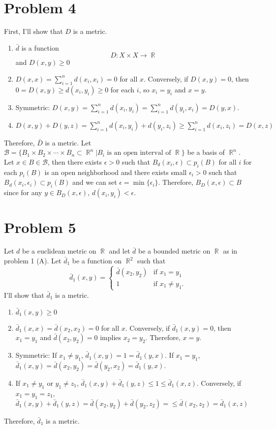 \documentclass{article}
\DeclareMathOperator{\rr}{\mathbb{R}}
\newcommand{\B}{\mathcal{B}}
\begin{document}
\section*{Problem 4}
First, I'll show that $D$ is a metric.
\begin{enumerate}
\item $\bar{d}$ is a function
\begin{equation*}
D:X\times X\longrightarrow \rr
\end{equation*}
and $D(x,y)\geq 0$
\item $D(x,x)=\sum\limits_{i=1}^n d(x_i, x_i)=0$ for all $x$. Conversely, if $D(x,y)=0$, then $ 0=D(x,y)\geq d(x_i, y_i)\geq 0$ for each $i$, so $x_i=y_i$ and $x=y$.
\item Symmetric: $D(x,y)=\sum\limits_{i=1}^n d(x_i, y_i)=\sum\limits_{i=1}^n d(y_i, x_i)=D(y,x)$.
\item $D(x,y)+D(y,z)=\sum\limits_{i=1}^n d(x_i, y_i)+ d(y_i, z_i)\geq \sum\limits_{i=1}^n d(x_i, z_i)=D(x,z)$
\end{enumerate}
Therefore, $\bar{D}$ is a metric.
Let $\B=\{B_1\times B_2\times\cdots\times B_n\subset \rr^n|B_i\text{ is an open interval of }\rr\}$ be a basis of $\rr^n$. Let $x\in B\in \B$, then there exists $\epsilon>0$ such that $B_d(x_i, \epsilon)\subset p_i(B)$ for all $i$ for each $p_i(B)$ is an open neighborhood and there exists small $\epsilon_i>0$ such that $B_d(x_i, \epsilon_i)\subset p_i(B)$ and we can set $\epsilon=\min\{\epsilon_i\}$. Therefore, $B_D(x, \epsilon)\subset B$ since for any $y\in B_D(x, \epsilon)$, $d(x_i, y_i)<\epsilon$.
\section*{Problem 5}
Let $d$ be a euclidean metric on $\rr$ and let $\bar{d}$ be a bounded metric on $\rr$ as in problem 1 (A). Let $\bar{d}_1$ be a function on $\rr^2$ such that
\begin{equation*}
\bar{d}_1(x,y)=
\begin{cases}
\bar{d}(x_2,y_2) & \text{if }x_1=y_1 \\
1 & \text{if } x_1\neq y_1.
\end{cases}
\end{equation*}
I'll show that $\bar{d}_1$ is a metric.
\begin{enumerate}
\item $\bar{d}_1(x,y)\geq 0$
\item $\bar{d}_1(x,x)=\bar{d}(x_2, x_2)=0$ for all $x$. Conversely, if $\bar{d}_1(x,y)=0$, then $x_1=y_1$ and $\bar{d}(x_2,y_2)=0$ implies $x_2=y_2$. Therefore, $x=y$.
\item Symmetric: If $x_1\neq y_1$, $\bar{d}_1(x,y)=1=\bar{d}_1(y,x)$. If $x_1=y_1$, $\bar{d}_1(x,y)=\bar{d}(x_2,y_2)=\bar{d}(y_2, x_2)=\bar{d}_1(y,x)$.
\item If $x_1\neq y_1$ or $y_1\neq z_1$, $\bar{d}_1(x,y)+\bar{d}_1(y,z)\leq 1 \leq \bar{d}_1(x,z)$. Conversely, if $x_1=y_1=z_1$, $\bar{d}_1(x,y)+\bar{d}_1(y,z)=\bar{d}(x_2,y_2)+\bar{d}(y_2,z_2)=\leq \bar{d}(x_2,z_2) = \bar{d}_1(x,z)$
\end{enumerate}
Therefore, $\bar{d}_1$ is a metric.
\end{document}
